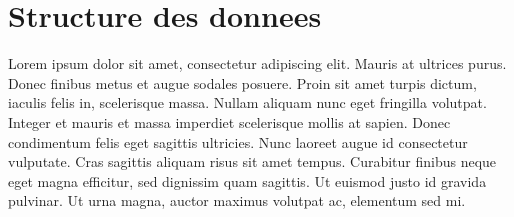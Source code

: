         \section{Structure des donnees}
        Lorem ipsum dolor sit amet, consectetur adipiscing elit. Mauris at ultrices purus. Donec finibus metus et augue sodales posuere. Proin sit amet turpis dictum, iaculis felis in, scelerisque massa. Nullam aliquam nunc eget fringilla volutpat. Integer et mauris et massa imperdiet scelerisque mollis at sapien. Donec condimentum felis eget sagittis ultricies. Nunc laoreet augue id consectetur vulputate. Cras sagittis aliquam risus sit amet tempus. Curabitur finibus neque eget magna efficitur, sed dignissim quam sagittis. Ut euismod justo id gravida pulvinar. Ut urna magna, auctor maximus volutpat ac, elementum sed mi.
    